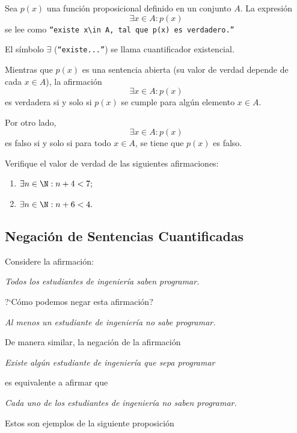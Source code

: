  Sea $p(x)$ una función proposicional definido en un conjunto $A.$ La expresión
 \[
 \label{lip:4.3}
   \exists x \in A: p(x)
 \]
 se lee como  \texttt{``existe $x\in A,$ tal que $p(x)$ es verdadero.''}

 El símbolo $\exists$ (\texttt{``existe...''}) se llama cuantificador existencial.




 Mientras que $p(x)$ es una sentencia abierta (su valor de verdad depende de cada $x\in A$), la afirmación
 $$\exists x\in A: p(x)$$ es verdadera si y solo si $p(x)$ se cumple para algún elemento $x\in A.$



 Por otro lado,  $$\exists x\in A: p(x)$$ es falso si y solo si para todo $ x\in A $, se tiene que $ p(x) $ es falso.



 Verifique el valor de verdad de las siguientes afirmaciones:
 \begin{enumerate}
  \item $\exists n  \in \N: n+4<7;$
  \item $\exists n \in \N: n+6<4.$
 \end{enumerate}



\subsection{Negación de Sentencias Cuantificadas}



 Considere la afirmación:
 \begin{center}
  \emph{Todos los estudiantes de ingeniería saben programar.}
 \end{center}
?`Cómo podemos negar esta afirmación?


\begin{center}
 \emph{Al menos un estudiante de ingeniería no sabe programar.}
\end{center}


 De manera similar, la negación de la afirmación
 \begin{center}
  \emph{Existe algún estudiante de ingeniería que sepa programar}
 \end{center}
 es equivalente a afirmar que
 \begin{center}
  \emph{Cada uno de los estudiantes de ingeniería no saben programar.}
 \end{center}

Estos son ejemplos de la siguiente proposición

